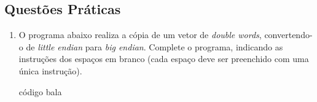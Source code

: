 \documentclass[11pt, a4paper]{book}
\newcommand{\putNASM}[3]{
    \begin{listing}[H]
        \caption{#1}
        \inputminted[linenos=true, frame=single]{nasm}{listings/#2}
        \label{#3}
    \end{listing}
}
\begin{document}
\subsection{Questões Práticas}
\begin{enumerate}[resume]
\item
O programa abaixo realiza a cópia de um vetor de \textit{double words}, 
convertendo-o de \textit{little endian} para \textit{big endian}.
Complete o programa, indicando as instruções dos espaços em branco 
(cada espaço deve ser preenchido com uma única instrução).


\putNASM{código bala}{little_endian.asm}{}


\end{enumerate}
		

\end{document}
